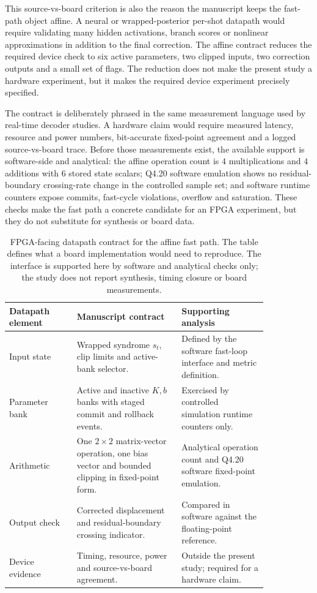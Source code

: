 \documentclass[11pt]{article}
\newcommand{\softwarehil}{controlled simulation}
\begin{document}
This source-vs-board criterion is also the reason the manuscript keeps the
fast-path object affine.  A neural or wrapped-posterior per-shot datapath would
require validating many hidden activations, branch scores or nonlinear
approximations in addition to the final correction.  The affine contract
reduces the required device check to six active parameters, two clipped inputs,
two correction outputs and a small set of flags.  The reduction does not make
the present study a hardware experiment, but it makes the required device
experiment precisely specified.

The contract is deliberately phrased in the same measurement language used by
real-time decoder studies.  A hardware claim would require measured latency,
resource and power numbers, bit-accurate fixed-point agreement and a logged
source-vs-board trace.  Before those measurements exist, the available support
is software-side and analytical: the affine operation count is \(4\)
multiplications and \(4\) additions with \(6\) stored state scalars; Q4.20
software emulation shows no
residual-boundary crossing-rate change in the controlled sample set; and
software runtime counters expose commits, fast-cycle violations, overflow and
saturation.  These checks make the fast path a concrete candidate for an FPGA
experiment, but they do not substitute for synthesis or board data.

\begin{table}[htbp]
\centering
\small
\begin{tabular}{@{}>{\raggedright\arraybackslash}p{0.22\linewidth}>{\raggedright\arraybackslash}p{0.34\linewidth}>{\raggedright\arraybackslash}p{0.28\linewidth}@{}}
\toprule
Datapath element & Manuscript contract & Supporting analysis \\
\midrule
Input state & Wrapped syndrome \(s_t\), clip limits and active-bank selector. &
Defined by the software fast-loop interface and metric definition. \\
\addlinespace
Parameter bank & Active and inactive \(K,b\) banks with staged commit and
rollback events. & Exercised by \softwarehil{} runtime counters only. \\
\addlinespace
Arithmetic & One \(2\times2\) matrix-vector operation, one bias vector and
bounded clipping in fixed-point form. & Analytical operation count and Q4.20
software fixed-point emulation. \\
\addlinespace
Output check & Corrected displacement and residual-boundary crossing
indicator. & Compared in software against the floating-point reference. \\
\addlinespace
Device evidence & Timing, resource, power and source-vs-board agreement. &
Outside the present study; required for a hardware claim. \\
\bottomrule
\end{tabular}
\caption{FPGA-facing datapath contract for the affine fast path.  The table
defines what a board implementation would need to reproduce.  The
interface is supported here by software and analytical checks only; the study
does not report synthesis, timing closure or board measurements.}
\label{tab:fpga-datapath-contract}
\end{table}
\end{document}
